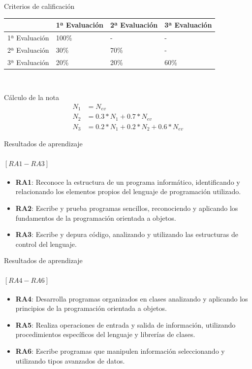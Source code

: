 \documentclass{beamer}
\begin{document}
\begin{frame}{Criterios de calificación}
    \begin{tabular}{|l|l|l|l|}
        \hline
        & 1ª Evaluación & 2ª Evaluación & 3ª Evaluación\\
        \hline
        1ª Evaluación & 100\% & - & -\\
        \hline
        2ª Evaluación & 30\%  & 70\% & -\\
        \hline
        3ª Evaluación & 20\%  & 20\% & 60\%\\
        \hline
    \end{tabular}\\[1em]

    \begin{block}{\tiny{Cálculo de la nota}}
        \vspace{-1.5em}
        \begin{align*}
            N_1 &= N_{ev}\\
            N_2 &= 0.3 * N_1 + 0.7 * N_{ev}\\
            N_3 &= 0.2 * N_1 + 0.2 * N_2 + 0.6 * N_{ev}
        \end{align*}
    \end{block}
\end{frame}

\begin{frame}{Resultados de aprendizaje}
    \framesubtitle{$[RA1-RA3]$}
    \begin{itemize}
        \item \textbf{RA1}: Reconoce la estructura de un programa informático, identificando y relacionando los elementos propios del lenguaje de programación utilizado.
        \item \textbf{RA2}: Escribe y prueba programas sencillos, reconociendo y aplicando los fundamentos de la programación orientada a objetos.
        \item \textbf{RA3}: Escribe y depura código, analizando y utilizando las estructuras de control del lenguaje.
    \end{itemize}
\end{frame}

\begin{frame}{Resultados de aprendizaje}
    \framesubtitle{$[RA4-RA6]$}
    \begin{itemize}
        \item \textbf{RA4}: Desarrolla programas organizados en clases analizando y aplicando los principios de la programación orientada a objetos.
        \item \textbf{RA5}: Realiza operaciones de entrada y salida de información, utilizando procedimientos específicos del lenguaje y librerías de clases.
        \item \textbf{RA6}: Escribe programas que manipulen información seleccionando y utilizando tipos avanzados de datos.
    \end{itemize}
\end{frame}
\end{document}
